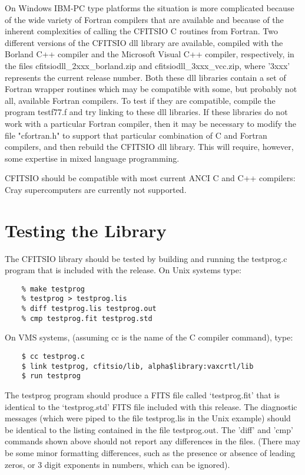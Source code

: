 \documentclass[11pt]{book}
\begin{document}
On Windows IBM-PC type platforms the situation is more complicated
because of the wide variety of Fortran compilers that are available and
because of the inherent complexities of calling the CFITSIO C routines
from Fortran.  Two different versions of the CFITSIO dll library are
available, compiled with the Borland C++ compiler and the Microsoft
Visual C++ compiler, respectively, in the files
cfitsiodll\_2xxx\_borland.zip and cfitsiodll\_3xxx\_vcc.zip, where
'3xxx' represents the current release number.  Both these dll libraries
contain a set of Fortran wrapper routines which may be compatible with
some, but probably not all, available Fortran compilers.  To test if
they are compatible, compile the program testf77.f and try linking to
these dll libraries.  If these libraries do not work with a particular
Fortran compiler, then it may be necessary to modify the file
"cfortran.h" to support that particular
combination of C and Fortran compilers, and then rebuild the CFITSIO
dll library.  This will require, however, some expertise in
mixed language programming.

CFITSIO should be compatible with most current ANCI C and C++ compilers:
Cray supercomputers are currently not supported.


\section{Testing the Library}

The CFITSIO library should be tested by building and running
the testprog.c program that is included with the release.
On Unix systems type:

\begin{verbatim}
    % make testprog
    % testprog > testprog.lis
    % diff testprog.lis testprog.out
    % cmp testprog.fit testprog.std
\end{verbatim}
 On VMS systems,
(assuming cc is the name of the C compiler command), type:

\begin{verbatim}
    $ cc testprog.c
    $ link testprog, cfitsio/lib, alpha$library:vaxcrtl/lib
    $ run testprog
\end{verbatim}
The testprog program should produce a FITS file called `testprog.fit'
that is identical to the `testprog.std' FITS file included with this
release.  The diagnostic messages (which were piped to the file
testprog.lis in the Unix example) should be identical to the listing
contained in the file testprog.out.  The 'diff' and 'cmp' commands
shown above should not report any differences in the files.  (There
may be some minor formatting differences, such as the presence or
absence of leading zeros, or 3 digit exponents in numbers,
which can be ignored).
\end{document}
